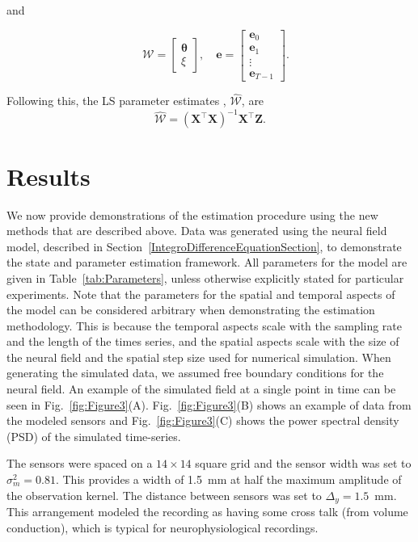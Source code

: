 \documentclass[review,authoryear,3p]{elsarticle}
\begin{document}
and
\begin{small}
\begin{equation*}
\quad \mathcal W=\left[
	\begin{array}{cc}
		\boldsymbol{\theta} \\
		\xi
	\end{array}
	\right],\quad \mathbf{e}=\left[
	\begin{array}{cccc}
		\mathbf e_0\\
		\mathbf e_1\\
		\vdots\\
		\mathbf e_{T-1}
	\end{array}
	\right].
\end{equation*}
\end{small}
Following this, the LS parameter estimates \citep{Ljung1999}, $ \hat{\mathcal{W}}$, are
\begin{equation}
	\hat{\mathcal{W}}=(\mathbf X^\top\mathbf X)^{-1}\mathbf X^\top\mathbf Z. 
\end{equation}

\section{Results}\label{ResultsSection} We now provide demonstrations of the estimation procedure using the new methods that are described above. Data was generated using the neural field model, described in Section~\ref{IntegroDifferenceEquationSection}, to demonstrate the state and parameter estimation framework. All parameters for the model are given in Table~\ref{tab:Parameters}, unless otherwise explicitly stated for particular experiments. Note that the parameters for the spatial and temporal aspects of the model can be considered arbitrary when demonstrating the estimation methodology. This is because the temporal aspects scale with the sampling rate and the length of the times series, and the spatial aspects scale with the size of the neural field and the spatial step size used for numerical simulation. When generating the simulated data, we assumed free boundary conditions for the neural field. An example of the simulated field at a single point in time can be seen in Fig.~\ref{fig:Figure3}(A). Fig.~\ref{fig:Figure3}(B) shows an example of data from the modeled sensors and Fig.~\ref{fig:Figure3}(C) shows the power spectral density (PSD) of the simulated time-series. 

The sensors were spaced on a $14 \times 14$ square grid and the sensor width was set to $\sigma^2_m = 0.81$. This provides a width of 1.5~mm at half the maximum amplitude of the observation kernel. The distance between sensors was set to $\Delta_y = 1.5$~mm. This arrangement modeled the recording as having some cross talk (from volume conduction), which is typical for neurophysiological recordings.
\end{document}
